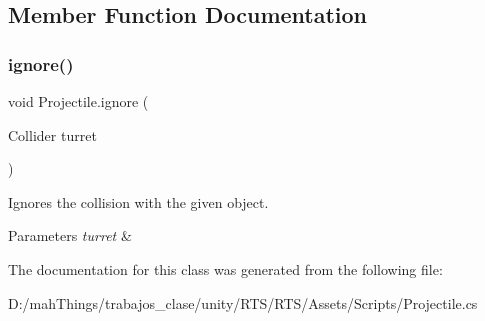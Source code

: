 \subsection{Member Function Documentation}
\mbox{\label{class_projectile_aa7e6481c7c93f758ce91fa04c5d913e0}} 
\subsubsection{\texorpdfstring{ignore()}{ignore()}}
{\footnotesize\ttfamily void Projectile.\+ignore (\begin{DoxyParamCaption}\item[{Collider}]{turret }\end{DoxyParamCaption})}



Ignores the collision with the given object. 


\begin{DoxyParams}{Parameters}
{\em turret} & \\
\hline
\end{DoxyParams}


The documentation for this class was generated from the following file\+:\begin{DoxyCompactItemize}
\item 
D\+:/mah\+Things/trabajos\+\_\+clase/unity/\+R\+T\+S/\+R\+T\+S/\+Assets/\+Scripts/Projectile.\+cs\end{DoxyCompactItemize}
